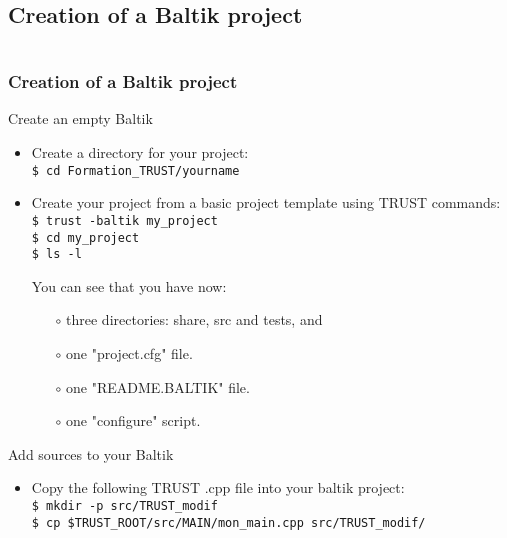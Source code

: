 \documentclass[10pt, hyperref={unicode=true,pdfusetitle, bookmarks=true,bookmarksnumbered=false,bookmarksopen=false, breaklinks=false,pdfborder={0 0 1},backref=true,colorlinks=true,linkcolor=darkblue,pageanchor, urlcolor=darkblue}]{beamer}
\begin{document}
\subsection{{\bf{Creation of a Baltik project}}}
\begin{frame}
\begin{columns}[c] 
\tableofcontents[sections={1-4},currentsection, currentsubsection]
\tableofcontents[sections={5-10},currentsection, currentsubsection]
\end{columns}
\end{frame}
\begin{frame}
\frametitle{Creation of a Baltik project}
\begin{block}{Create an empty Baltik}

\begin{itemize}
\item Create a directory for your project:\\
\texttt{\$ cd Formation\_TRUST/yourname}

\item Create your project from a basic project template using TRUST commands:\\
\texttt{\$ trust -baltik my\_project}\\
\texttt{\$ cd my\_project}\\

\texttt{\$ ls -l}

You can see that you have now:
    \begin{itemize}
    \item [$\circ$] three directories: share, src and tests, and
    \item [$\circ$] one "project.cfg" file.
    \item [$\circ$] one "README.BALTIK" file.
    \item [$\circ$] one "configure" script.
    \end{itemize}
    \end{itemize}    
\end{block}

\begin{block}{Add sources to your Baltik}
\begin{itemize}
\item Copy the following TRUST .cpp file into your baltik project:\\
\texttt{\$ mkdir -p src/TRUST\_modif} \\
\texttt{\$ cp \$TRUST\_ROOT/src/MAIN/mon\_main.cpp src/TRUST\_modif/}
\end{itemize}

\end{block}
\end{frame}
\end{document}
